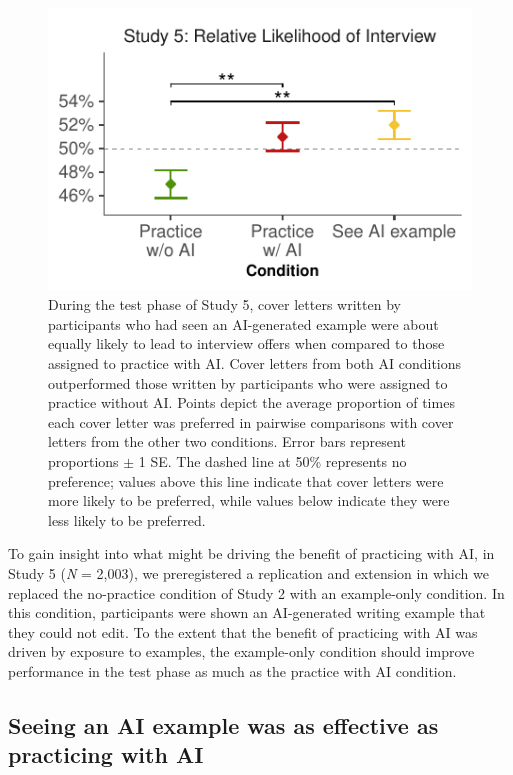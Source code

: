 \documentclass[11pt]{report}
\begin{document}
\begin{mainf}
\begin{figure}[]
    \centering
    \includegraphics[width=1\linewidth]{ratings2.pdf}
    \caption{During the test phase of Study 5, cover letters written by participants who had seen an AI-generated example were about equally likely to lead to interview offers when compared to those assigned to practice with AI. Cover letters from both AI conditions outperformed those written by participants who were assigned to practice without AI. Points depict the average proportion of times each cover letter was preferred in pairwise comparisons with cover letters from the other two conditions. Error bars represent proportions $\pm$ 1 SE. The dashed line at 50\% represents no preference; values above this line indicate that cover letters were more likely to be preferred, while values below indicate they were less likely to be preferred.}
    \label{fig:ratings2}
\end{figure}

To gain insight into what might be driving the benefit of practicing with AI, in Study 5 (\emph{N} = 2,003), we preregistered a replication and extension in which we replaced the no-practice condition of Study 2 with an example-only condition.
In this condition, participants were shown an AI-generated writing example that they could not edit. 
To the extent that the benefit of practicing with AI was driven by exposure to examples, the example-only condition should improve performance in the test phase as much as the practice with AI condition.

\subsection*{Seeing an AI example was as effective as practicing with
AI}\label{seeing-an-ai-example-was-as-effective-as-practicing-with-ai}


\end{mainf}
\end{document}
